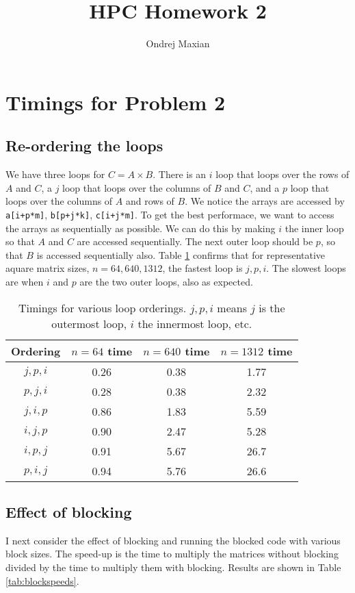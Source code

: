 \documentclass[a4paper]{article}
\title{HPC Homework 2}
\author{Ondrej Maxian}
\begin{document}
\maketitle

\section*{Timings for Problem 2}

\subsection*{Re-ordering the loops}
We have three loops for $C=A \times B$. There is an $i$ loop that loops over the rows of $A$ and $C$, a $j$ loop that loops over the columns of $B$ and $C$, and a $p$ loop that loops over the columns of $A$ and rows of $B$. We notice the arrays are accessed by \texttt{a[i+p*m]},  \texttt{b[p+j*k]},  \texttt{c[i+j*m]}. To get the best performace, we want to access the arrays as sequentially as possible. We can do this by making $i$ the inner loop so that $A$ and $C$ are accessed sequentially. The next outer loop should be $p$, so that $B$ is accessed sequentially also. Table \ref{tab:looporders} confirms that for representative aquare matrix sizes, $n=64, 640, 1312$, the fastest loop is $j,p,i$. The slowest loops are when $i$ and $p$ are the two outer loops, also as expected. 

\begin{table}[ht]
\centering
\begin{tabular}{c|c|c|c} 
Ordering & $n=64$ time & $n=640$ time & $n=1312$ time \\[2 pt] \hline
$j,p,i$ & 0.26 & 0.38 & 1.77 \\[2 pt]
$p,j,i$ & 0.28 & 0.38 & 2.32 \\[2 pt]
$j,i,p$ & 0.86 & 1.83 & 5.59 \\[2 pt]
$i,j,p$ & 0.90 & 2.47 & 5.28 \\[2 pt]
$i,p,j$ & 0.91 & 5.67 & 26.7 \\[2 pt]
$p,i,j$ & 0.94 & 5.76 & 26.6
\end{tabular}
\caption{Timings for various loop orderings. $j,p,i$ means $j$ is the outermost loop, $i$ the innermost loop, etc.}
\label{tab:looporders}
\end{table}

\subsection*{Effect of blocking}
I next consider the effect of blocking and running the blocked code with various block sizes. The speed-up is the time to multiply the matrices without blocking divided by the time to multiply them with blocking. Results are shown in Table \ref{tab:blockspeeds}. 
\end{document}
